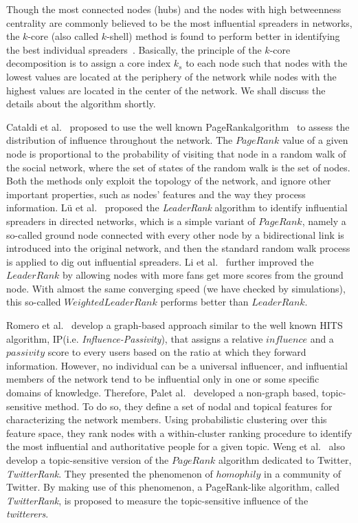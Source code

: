 \documentclass[sigconf]{acmart}
\begin{document}
Though the most connected nodes (hubs) and the nodes with high betweenness centrality are commonly believed to be the most influential spreaders in networks, the $k$-core (also called $k$-shell) method is found to perform better in identifying the best individual spreaders~\cite{kitsak2010identification,carmi2007model}. Basically, the principle of
the $k$-core decomposition is to assign a core index $k_s$ to each node such that nodes with the lowest values are located at the periphery of the network while nodes with the highest values are located in the center of the network. We shall discuss the details about the algorithm shortly. 

Cataldi et al.~\cite{cataldi2010emerging} proposed to use the well known PageRankalgorithm~\cite{page1999pagerank} to assess the distribution of influence throughout the network. The $PageRank$ value of a given node is proportional to the probability of visiting that node in a random walk of the social network, where the set of states of the random walk is the set of nodes. Both the methods only exploit the topology of the network, and ignore other important properties, such as nodes’ features and the way they process information. L\"u et al.~\cite{lu2011leaders} proposed the \emph{LeaderRank} algorithm to identify influential spreaders in directed networks, which is a simple variant of $PageRank$, namely a so-called ground node connected with every other node by a bidirectional link is introduced into the original network, and then the standard random walk process is applied to dig out influential spreaders. Li et al.~\cite{li2014identifying} further improved the $LeaderRank$ by allowing nodes with more fans get more scores from the ground node. With almost the same converging speed (we have checked by simulations), this so-called $Weighted LeaderRank$ performs better than $LeaderRank$.

Romero et al.~\cite{romero2011influence} develop a graph-based approach similar to the well known HITS algorithm, IP(i.e. \emph{Influence-Passivity}), that assigns a relative $influence$ and a $passivity$ score to every users based on the ratio at which they forward information. However, no individual can be a universal influencer, and influential members of the network tend to be influential only in one or some specific domains of knowledge. Therefore, Palet al.~\cite{pal2011identifying} developed a non-graph based, topic-sensitive method. To do so, they define a set of nodal and topical features for characterizing the network members. Using probabilistic clustering over this feature space, they rank nodes with a within-cluster ranking procedure to identify the most influential and authoritative people for a given topic. Weng et al.~\cite{weng2010twitterrank} also develop a topic-sensitive version of the $PageRank$ algorithm dedicated to Twitter, \emph{TwitterRank}. They presented the phenomenon of $homophily$ in a community of Twitter. By making use of this phenomenon, a PageRank-like algorithm, called \emph{TwitterRank}, is proposed to measure the topic-sensitive influence of the \emph{twitterers}. 
\end{document}

